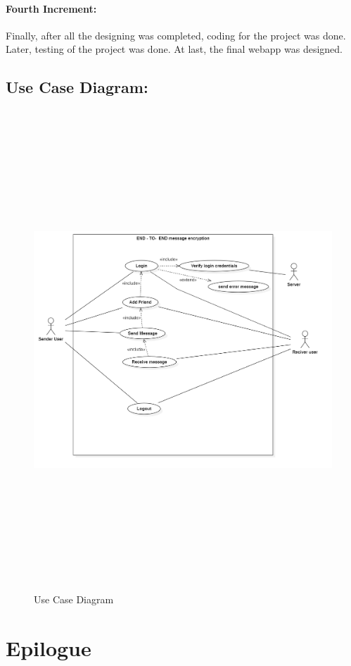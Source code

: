 \subsubsection{Fourth Increment:}
Finally, after all the designing was completed, coding for the project was done. Later,
testing of the project was done.
At last, the final webapp was designed.
\pagebreak


\section{Use Case Diagram:}
\begin{figure}[H]
	\centering
	\includegraphics[width=180mm, height=180mm]{images/UseCaseDiagram1.png}
	\caption{Use Case Diagram} %
	\label{figusecase} %
\end{figure}




\chapter{Epilogue}

